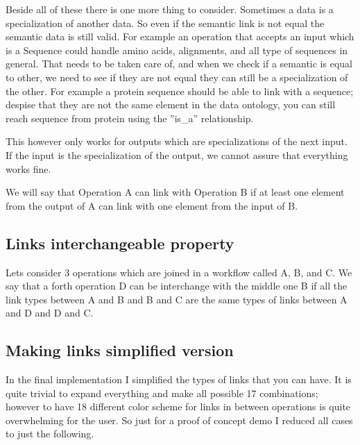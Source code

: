 \documentclass[a4paper,10pt]{article}
\begin{document}
\begin{itemize}
\begin{itemize}
    \end{itemize}

  \end{itemize}

  Beside all of these there is one more thing to consider. Sometimes a data is a specialization of another data. So even if the semantic link is not equal the semantic data is still valid. For example an operation that accepts an input which is a Sequence could handle amino acids, alignments, and all type of sequences in general. That needs to be taken care of, and when we check if a semantic is equal to other, we need to see if they are not equal they can still be a specialization of the other. For example a protein sequence should be able to link with a sequence; despise that they are not the same element in the data ontology, you can still reach sequence from protein using the ''is\_a'' relationship.\vspace{3 mm}

  This however only works for outputs which are specializations of the next input. If the input is the specialization of the output, we cannot assure that everything works fine.\vspace{3 mm}

  We will say that Operation A can link with Operation B if at least one element from the output of A can link with one element from the input of B.

  \subsection{Links interchangeable property}

  Lets consider 3 operations which are joined in a workflow called A, B, and C. We say that a forth operation D can be interchange with the middle one B if all the link types between A and B and B and C are the same types of links between A and D and D and C.

  \subsection{Making links simplified version}
  \label{sec:makinglinksSimple}

  In the final implementation I simplified the types of links that you can have. It is quite trivial to expand everything and make all possible 17 combinations; however to have 18 different color scheme for links in between operations is quite overwhelming for the user. So just for a proof of concept demo I reduced all cases to just the following.\vspace{3 mm}
\end{document}
